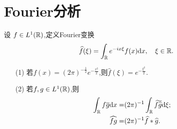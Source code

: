 \section{Fourier分析}
\begin{exercise}\label{exe2-7}
  设 $f\in L^{1}(\mathbb{R})$,定义Fourier变换
  \[
    \widehat{f}(\xi)=\int_{\mathbb{R}}e^{-ix\xi}f(x)\mathrm{d}x,\quad \xi \in \mathbb{R}.
  \] 
  \begin{enumerate}
    \item [(1)]若$f(x)=(2\pi)^{-\frac{1}{2}}e^{- \frac{x^2}{2}}$,则$\widehat{f}(\xi)=e^{-\frac{\xi^2}{2}}$.
    \item [(2)]若$f,g\in L^{1}(\mathbb{R})$,则
      \begin{align*}
	\int_{\mathbb{R}}f\overline{g}\mathrm{d}x=&(2\pi)^{-1}\int_{\mathbb{R}}\widehat{f}\overline{\widehat{g}}\mathrm{d}\xi;\\
	\widehat{fg}=&(2\pi)^{-1}\widehat{f}* \widehat{g}.
      \end{align*}
  \end{enumerate}
\end{exercise}
